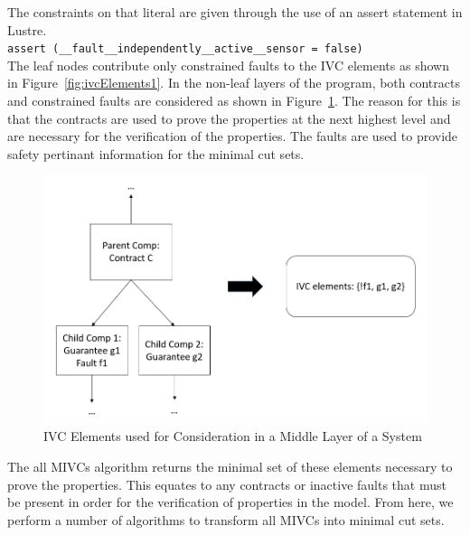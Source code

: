 The constraints on that literal are given through the use of an assert statement in Lustre.\\ \texttt{assert (\_\_fault\_\_independently\_\_active\_\_sensor = false)}\\

The leaf nodes contribute only constrained faults to the IVC elements as shown in Figure~\ref{fig:ivcElements1}. In the non-leaf layers of the program, both contracts and constrained faults are considered as shown in Figure~\ref{fig:ivcElements2}. The reason for this is that the contracts are used to prove the properties at the next highest level and are necessary for the verification of the properties. The faults are used to provide safety pertinant information for the minimal cut sets. 

\begin{figure}[htbp]
	\hspace*{-2cm}
	\vspace{-0.1in} 
	\begin{center}
		\includegraphics[scale=0.5]{images/ivcElements2.png}
	\caption{IVC Elements used for Consideration in a Middle Layer of a System}
		\label{fig:ivcElements2}
	\end{center}
\end{figure}

The all MIVCs algorithm returns the minimal set of these elements necessary to prove the properties. This equates to any contracts or inactive faults that must be present in order for the verification of properties in the model. From here, we perform a number of algorithms to transform all MIVCs into minimal cut sets.


